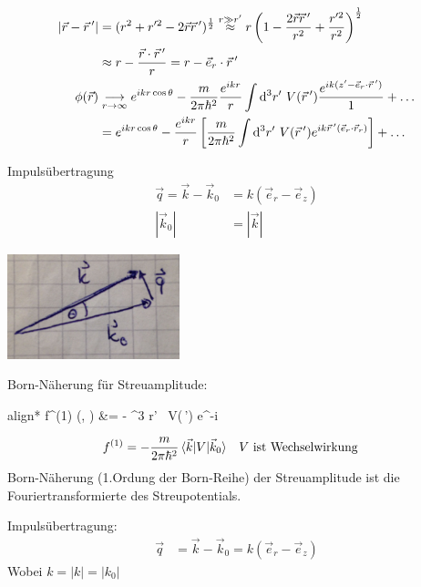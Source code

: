 		\begin{align*}
			|\vec{r} - \vec{r}\,'| &= (r^2+r'^2 - 2 \vec{r} \vec{r}\,')^{\frac{1}{2}} 
			\overset{r \gg r'}{\approx}
			r \left(1 - \frac{2 \vec{r} \vec{r}\,'}{r^2} + \frac{r'^2}{r^2}\right)^{\frac{1}{2}}\\
			&\approx r - \frac{\vec{r} \cdot \vec{r}\,'}{r} = r - \vec{e}_r \cdot \vec{r}\,'\\
			\phi (\vec{r}) &\underset{r\rightarrow \infty}{\longrightarrow} 
			e^{ikr \cos \theta} 
			- \frac{m}{2 \pi \hbar^2} \frac{e^{ikr}}{r}
			\int \mathrm{d}^3 r' ~V(\vec{r}\,') 
			\frac{e^{ik (z' - \vec{e}_r \cdot \vec{r}\,')}}{1} + \ldots \\
			&= e^{ikr \cos \theta} - \frac{e^{ikr}}{r}
			\left[ \frac{m}{2 \pi \hbar^2} \int \mathrm{d}^3 r' ~V(\vec{r}\,') 
				e^{ik \vec{r}\,' (\vec{e}_r \cdot \vec{r}_r)} 
			\right] + \ldots
		\end{align*}
	\begin{minipage}{0.5\textwidth}
	Impulsübertragung
		\begin{align*}
		\vec{q} = \vec{k} - \vec{k}_0 &= k (\vec{e}_r - \vec{e}_z) \\
		|\vec{k}_0| &= |\vec{k}|
		\end{align*}
	\end{minipage}
	\hfill
	\begin{minipage}{0.4\textwidth}
		\includegraphics[width=5cm]{Born_Naeherung2}
	\end{minipage}
		
	Born-Näherung für Streuamplitude:
		\begin{empheq}[box=\boxed]{align*}
			f^{(1)} (\theta, \phi) &= - 
			\int \diff^3 r' ~V(\,') e^{-i  }
		\end{empheq}
		\begin{align*}
			f^{(1)} &= -\frac{m}{2 \pi \hbar^2}  \braket{\vec{k}| V | \vec{k}_0}
			& &V \text{ ist Wechselwirkung}
		\end{align*}
	Born-Näherung (1.Ordung der Born-Reihe) der Streuamplitude ist die Fouriertransformierte des Streupotentials.
	
	Impulsübertragung: 
		\begin{align*}
			\vec{q} &= \vec{k} - \vec{k}_0 
			= k (\vec{e}_r - \vec{e}_z)
		\end{align*}
	Wobei $k = |k| = |k_0|$

